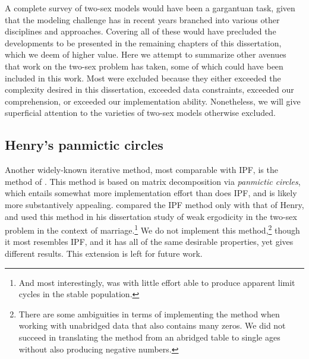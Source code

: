 \label{sec:other}
A complete survey of two-sex models would have been a gargantuan task, given
that the modeling challenge has in recent years branched into various other
disciplines and approaches. Covering all of these would have precluded the
developments to be presented in the remaining chapters of this dissertation,
which we deem of higher value. Here we attempt to summarize other avenues that
work on the two-sex problem has taken, some of which could have been included in this work. Most were excluded because they either exceeded the
complexity desired in this dissertation, exceeded data constraints, exceeded our
comprehension, or exceeded our implementation ability. Nonetheless, we will give
superficial attention to the varieties of two-sex models otherwise excluded.

\subsection{Henry's panmictic circles} 
Another widely-known iterative method, 
most comparable with IPF, is the method of \textit{\citet{henry1972nuptiality}}.
This method is based on matrix decomposition via \textit{panmictic circles},
which entails somewhat more implementation effort than does IPF, and is likely 
more substantively appealing. \citet{mc1975models} compared the
IPF method only with that of Henry, and \citet{wijewickrema1980weak} used this
method in his dissertation study of weak ergodicity in the two-sex problem in the
context of marriage.\footnote{And most interestingly, was with little
effort able to produce apparent limit cycles in the stable population.} We do
not implement this method,\footnote{There are some ambiguities in terms of 
implementing the method when working with unabridged data that also contains 
many zeros. We did not succeed in translating the method from an
abridged table to single ages without also producing negative numbers.} though
it most resembles IPF, and it has all of the same desirable properties, yet
gives different results. This extension is left for future work.

